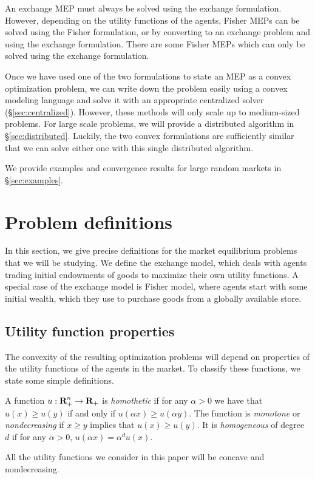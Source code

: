 \documentclass[12pt]{article}
\begin{document}
An exchange MEP must always be solved using the exchange formulation. However,
depending on the utility functions of the agents,
Fisher MEPs can be solved using the Fisher formulation, or by converting to an exchange problem and using the exchange formulation.
There are some Fisher MEPs which can only be solved using the exchange formulation.

Once we have used one of the two formulations to state an MEP as a convex optimization problem,
we can write down the problem easily using a convex modeling language and solve it with an appropriate centralized solver (\S\ref{sec:centralized}). However, these methods will only scale up to medium-sized problems. For large scale problems, we will provide a distributed
algorithm in \S\ref{sec:distributed}. Luckily, the two convex formulations are sufficiently similar that we can solve either one with this single distributed algorithm.

We provide examples and convergence results for large random markets in \S\ref{sec:examples}.


\section{Problem definitions}
\label{sec:defs}
In this section, we give precise definitions for the market equilibrium problems that we will be studying. We define the exchange model,
which deals with agents trading initial endowments of goods to maximize their own utility functions.
A special case of the exchange model is Fisher model, where agents
start with some initial wealth, which they use to purchase goods 
from a globally available store.

\subsection{Utility function properties}
The convexity of the resulting optimization problems will depend on properties of the
utility functions of the agents in the market.
To classify these functions, we state some simple definitions.

A function $u: {\mbox{\bf R}}^n_+ \to {\mbox{\bf R}}_+$ is \emph{homothetic} if for any $\alpha > 0$ we have that $u(x) \geq u(y)$ if and only if
$u(\alpha x) \geq u(\alpha y)$.
The function is \emph{monotone} or \emph{nondecreasing} if $x \geq y$ implies that $u(x) \geq u(y)$.
It is \emph{homogeneous} of degree $d$ if for any $\alpha > 0$,
$u(\alpha x) = \alpha^d u(x)$.

All the utility functions we consider in this paper will
be concave and nondecreasing.
\end{document}

